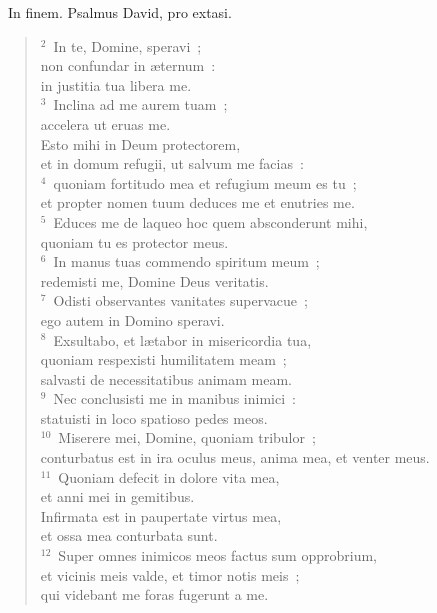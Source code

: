 ~\lettrine[lines=10,image=true,loversize=0.05,lraise=-0.03]{I}{}n finem. Psalmus David, pro extasi.
\begin{flushleft}\begin{verse}\vspace{6pt}${}^{2}$~In te, Domine, speravi~;\\ non confundar in \ae ternum~:\\ in justitia tua libera me.\\
${}^{3}$~Inclina ad me aurem tuam~;\\ accelera ut eruas me.\\ Esto mihi in Deum protectorem,\\ et in domum refugii, ut salvum me facias~:\\
${}^{4}$~quoniam fortitudo mea et refugium meum es tu~;\\ et propter nomen tuum deduces me et enutries me.\\
${}^{5}$~Educes me de laqueo hoc quem absconderunt mihi,\\ quoniam tu es protector meus.\\
${}^{6}$~In manus tuas commendo spiritum meum~;\\ redemisti me, Domine Deus veritatis.\\
${}^{7}$~Odisti observantes vanitates supervacue~;\\ ego autem in Domino speravi.\\
${}^{8}$~Exsultabo, et l\ae tabor in misericordia tua,\\ quoniam respexisti humilitatem meam~;\\ salvasti de necessitatibus animam meam.\\
${}^{9}$~Nec conclusisti me in manibus inimici~:\\ statuisti in loco spatioso pedes meos.\\
${}^{10}$~Miserere mei, Domine, quoniam tribulor~;\\ conturbatus est in ira oculus meus, anima mea, et venter meus.\\
${}^{11}$~Quoniam defecit in dolore vita mea,\\ et anni mei in gemitibus.\\ Infirmata est in paupertate virtus mea,\\ et ossa mea conturbata sunt.\\
${}^{12}$~Super omnes inimicos meos factus sum opprobrium,\\ et vicinis meis valde, et timor notis meis~;\\ qui videbant me foras fugerunt a me.\\

\end{verse}
\end{flushleft}
